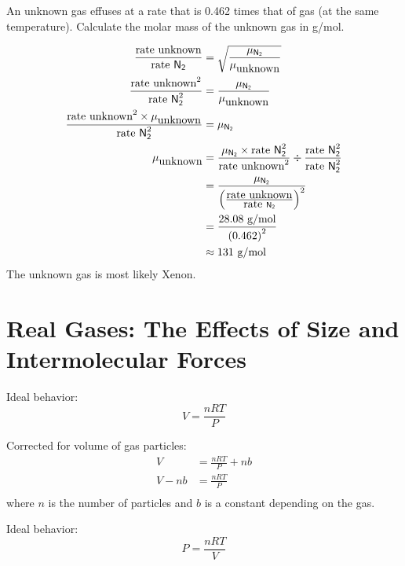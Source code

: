\documentclass[
	chapter=5,
	title={Gases},
	showanswers=true,
]{chem122notes}
\begin{document}
An unknown gas effuses at a rate that is 0.462 times that of  gas (at the same temperature).
Calculate the molar mass of the unknown gas in g/mol.
\begin{answer}
	\begin{equation*}
	\begin{aligned}
		\frac{\mbox{rate unknown}}{\mbox{rate } \ce{N2}} &= \sqrt{\frac{\mu_{\ce{N2}}}{\mu_{\mbox{unknown}}}}\\
		\frac{\mbox{rate unknown}^{2}}{\mbox{rate } \ce{N2}^{2}} &= \frac{\mu_{\ce{N2}}}{\mu_{\mbox{unknown}}}\\
		\frac{\mbox{rate unknown}^{2}\times \mu_{\mbox{unknown}}}{\mbox{rate } \ce{N2}^{2}} &= \mu_{\ce{N2}}\\
		\mu_{\mbox{unknown}} &= \frac{\mu_{\ce{N2}} \times \mbox{rate } \ce{N2}^{2}}{\mbox{rate unknown}^{2}} \div \frac{\mbox{rate } \ce{N2}^{2}}{\mbox{rate } \ce{N2}^{2}}\\
							 &= \frac{\mu_{\ce{N2}}}{\left( \frac{\mbox{rate unknown}}{\mbox{rate } \ce{N2}} \right)^{2}}\\
							 &= \frac{28.08 \mbox{ g/mol}}{\left( 0.462 \right)^{2}}\\
							 &\approx 131 \mbox{ g/mol}\\
	\end{aligned}
	\end{equation*}
	The unknown gas is most likely Xenon.
\end{answer}

\section{Real Gases: The Effects of Size and Intermolecular Forces}\label{sec:real-gases}
Ideal behavior:
\begin{equation}
	V = \frac{nRT}{P}
	\label{eq:ideal-gas-behavior-volume}
\end{equation}

Corrected for volume of gas particles:
\begin{equation}
	\begin{aligned}
		V &= \frac{nRT}{P} + nb\\
		V - nb &= \frac{nRT}{P}\\
	\end{aligned}
	\label{eq:ideal-gas-behavior-with-particle-volumes}
\end{equation}
where $n$ is the number of particles and $b$ is a constant depending on the gas.

Ideal behavior:
\begin{equation}
	P = \frac{nRT}{V}
	\label{eq:ideal-gas-behavior-pressure}
\end{equation}
\end{document}
